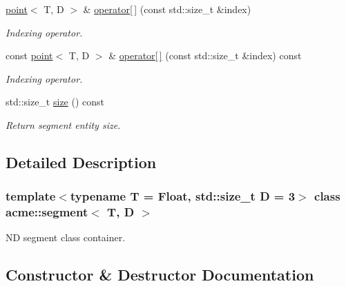 \begin{DoxyCompactItemize}
\hyperlink{classacme_1_1point}{point}$<$ T, D $>$ \& \hyperlink{classacme_1_1segment_a2568404daa12f87d797afb4a1b48a7a9}{operator\mbox{[}$\,$\mbox{]}} (const std\+::size\+\_\+t \&index)
\begin{DoxyCompactList}\small\item\em Indexing operator. \end{DoxyCompactList}\item 
const \hyperlink{classacme_1_1point}{point}$<$ T, D $>$ \& \hyperlink{classacme_1_1segment_afae74662ff8f8349b09b13b514aeb071}{operator\mbox{[}$\,$\mbox{]}} (const std\+::size\+\_\+t \&index) const
\begin{DoxyCompactList}\small\item\em Indexing operator. \end{DoxyCompactList}\item 
\mbox{\label{classacme_1_1segment_ae5df9e0d026dab3462788d805a7221fc}} 
std\+::size\+\_\+t \hyperlink{classacme_1_1segment_ae5df9e0d026dab3462788d805a7221fc}{size} () const
\begin{DoxyCompactList}\small\item\em Return segment entity size. \end{DoxyCompactList}\end{DoxyCompactItemize}


\subsection{Detailed Description}
\subsubsection*{template$<$typename T = Float, std\+::size\+\_\+t D = 3$>$\newline
class acme\+::segment$<$ T, D $>$}

ND segment class container. 

\subsection{Constructor \& Destructor Documentation}
\mbox{\label{classacme_1_1segment_af0b4da3b6d22d0e294fbf515b675d687}} 
